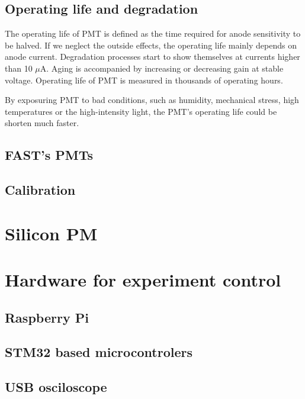 \subsection{Operating life and degradation}
The operating life of PMT is defined as the time required for anode sensitivity to be halved. If we neglect the outside effects, the operating life mainly depends on anode current. 
Degradation processes start to show themselves at currents higher than 10 $\mu$A. Aging is accompanied by increasing or decreasing gain at stable voltage. Operating life of PMT is measured in thousands of operating hours.
\par
By exposuring PMT to bad conditions, such as humidity, mechanical stress, high temperatures or the high-intensity light, the PMT's operating life could be shorten much faster.
\subsection{FAST's PMTs}

\subsection{Calibration}


\section{Silicon PM}


\section{Hardware for experiment control}

\subsection{Raspberry Pi}

\subsection{STM32 based microcontrolers}

\subsection{USB osciloscope}

